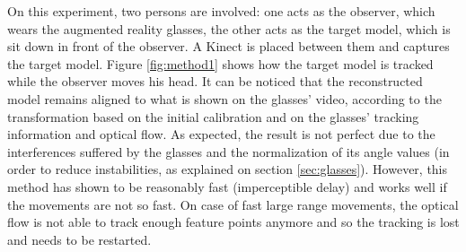 \documentclass[msc, a4paper, classic, en]{ufbathesis}
\begin{document}
\label{sec:results}

On this experiment, two persons are involved: one acts as the observer, which wears the augmented reality glasses, the other acts as the target model, which is sit down in front of the observer. A Kinect is placed between them and captures the target model. Figure \ref{fig:method1} shows how the target model is tracked while the observer moves his head. It can be noticed that the reconstructed model remains aligned to what is shown on the glasses' video, according to the transformation based on the initial calibration and on the glasses' tracking information and optical flow. As expected, the result is not perfect due to the interferences suffered by the glasses and the normalization of its angle values (in order to reduce instabilities, as explained on section \ref{sec:glasses}). However, this method has shown to be reasonably fast (imperceptible delay) and works well if the movements are not so fast. On case of fast large range movements, the optical flow is not able to track enough feature points anymore and so the tracking is lost and needs to be restarted.
\end{document}
